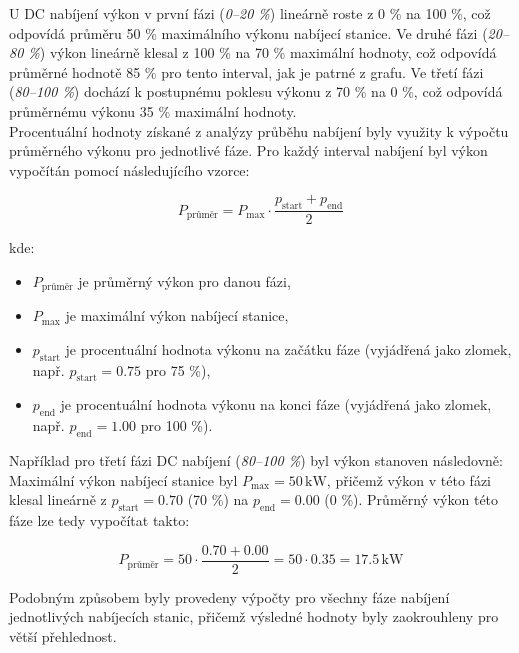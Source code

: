 \documentclass[a4paper,11pt]{article}
\begin{document}
U DC nabíjení výkon v první fázi (\textit{0–20 \%}) lineárně roste z 0 \% na 100 \%, což odpovídá průměru 50 \% maximálního výkonu nabíjecí stanice. Ve druhé fázi (\textit{20–80 \%}) výkon lineárně klesal z 100 \% na 70 \% maximální hodnoty, což odpovídá průměrné hodnotě 85 \% pro tento interval, jak je patrné z grafu. Ve třetí fázi (\textit{80–100 \%}) dochází k postupnému poklesu výkonu z 70 \% na 0 \%, což odpovídá průměrnému výkonu 35 \% maximální hodnoty.\\

Procentuální hodnoty získané z analýzy průběhu nabíjení byly využity k výpočtu průměrného výkonu pro jednotlivé fáze. Pro každý interval nabíjení byl výkon vypočítán pomocí následujícího vzorce:

\[
P_{\text{průměr}} = P_{\text{max}} \cdot \frac{p_{\text{start}} + p_{\text{end}}}{2}
\]

kde:
\begin{itemize}
    \item \(P_{\text{průměr}}\) je průměrný výkon pro danou fázi,
    \item \(P_{\text{max}}\) je maximální výkon nabíjecí stanice,
    \item \(p_{\text{start}}\) je procentuální hodnota výkonu na začátku fáze (vyjádřená jako zlomek, např. \(p_{\text{start}} = 0.75\) pro 75 \%),
    \item \(p_{\text{end}}\) je procentuální hodnota výkonu na konci fáze (vyjádřená jako zlomek, např. \(p_{\text{end}} = 1.00\) pro 100 \%).\\
\end{itemize}

Například pro třetí fázi DC nabíjení (\textit{80–100 \%}) byl výkon stanoven následovně: \\

Maximální výkon nabíjecí stanice byl \(P_{\text{max}} = 50 \, \mathrm{kW}\), přičemž výkon v této fázi klesal lineárně z \(p_{\text{start}} = 0.70\) (70 \%) na \(p_{\text{end}} = 0.00\) (0 \%). Průměrný výkon této fáze lze tedy vypočítat takto:

\[
P_{\text{průměr}} = 50 \cdot \frac{0.70 + 0.00}{2} = 50 \cdot 0.35 = 17.5 \, \mathrm{kW}
\]

Podobným způsobem byly provedeny výpočty pro všechny fáze nabíjení jednotlivých nabíjecích stanic, přičemž výsledné hodnoty byly zaokrouhleny pro větší přehlednost.
\end{document}
